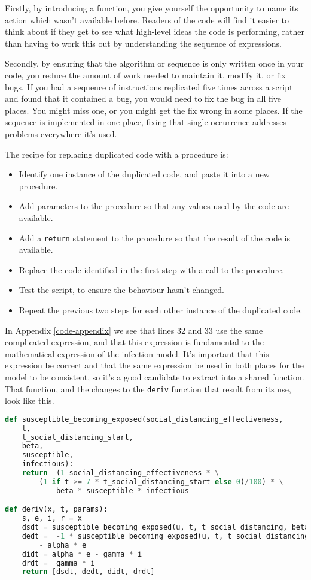 \documentclass[a4paper]{article}
\begin{document}
Firstly, by introducing a function, you give yourself the opportunity to name its action which wasn't available before.
Readers of the code will find it easier to think about if they get to see what high-level ideas the code is performing, rather than having to work this out by understanding the sequence of expressions.

Secondly, by ensuring that the algorithm or sequence is only written once in your code, you reduce the amount of work needed to maintain it, modify it, or fix bugs.
If you had a sequence of instructions replicated five times across a script and found that it contained a bug, you would need to fix the bug in all five places.
You might miss one, or you might get the fix wrong in some places.
If the sequence is implemented in one place, fixing that single occurrence addresses problems everywhere it's used.

The recipe for replacing duplicated code with a procedure is:

\begin{itemize}
  \item Identify one instance of the duplicated code, and paste it into a new procedure.
  \item Add parameters to the procedure so that any values used by the code are available.
  \item Add a \texttt{return} statement to the procedure so that the result of the code is available.
  \item Replace the code identified in the first step with a call to the procedure.
  \item Test the script, to ensure the behaviour hasn't changed.
  \item Repeat the previous two steps for each other instance of the duplicated code.
\end{itemize}

In Appendix \ref{code-appendix} we see that lines 32 and 33 use the same complicated expression, and that this expression is fundamental to the mathematical expression of the infection model.
It's important that this expression be correct and that the same expression be used in both places for the model to be consistent, so it's a good candidate to extract into a shared function.
That function, and the changes to the \texttt{deriv} function that result from its use, look like this.

\begin{lstlisting}[language=Python]
def susceptible_becoming_exposed(social_distancing_effectiveness, 
    t,
    t_social_distancing_start,
    beta,
    susceptible,
    infectious):
    return -(1-social_distancing_effectiveness * \
        (1 if t >= 7 * t_social_distancing_start else 0)/100) * \
            beta * susceptible * infectious

def deriv(x, t, params):
    s, e, i, r = x
    dsdt = susceptible_becoming_exposed(u, t, t_social_distancing, beta, s, i)
    dedt =  -1 * susceptible_becoming_exposed(u, t, t_social_distancing, beta, s, i)\
        - alpha * e
    didt = alpha * e - gamma * i
    drdt =  gamma * i
    return [dsdt, dedt, didt, drdt]
\end{lstlisting}
\end{document}
